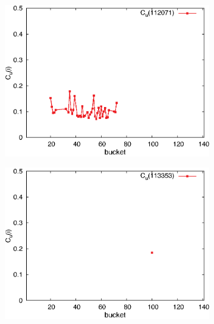 \begin{figure}[H]
\begin{subfigure}[b]{0.32\textwidth}
          \includegraphics[width=\textwidth]{chapters/03_implementation/u112071}
        \end{subfigure}
        \begin{subfigure}[b]{0.32\textwidth}
          \centering
          \includegraphics[width=\textwidth]{chapters/03_implementation/u113353}
        \end{subfigure}
        \begin{subfigure}[b]{0.32\textwidth}
          \centering

\end{subfigure}
\end{figure}

